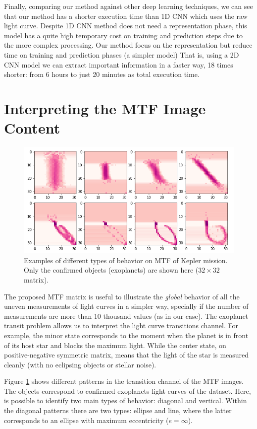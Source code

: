 Finally, comparing our method against other deep learning techniques, we can see that our method has a shorter execution time than 1D CNN which uses the raw light curve. Despite 1D CNN method does not need a representation phase, this model has a quite high temporary cost on training and prediction steps due to the more complex processing. Our method focus on the representation but reduce time on training and prediction phases (a simpler model)
That is, using a 2D CNN model we can extract important information in a faster way, 18 times shorter: from 6 hours to just 20 minutes as total execution time.

\section{Interpreting the MTF Image Content}
\begin{figure}[t!]
\centering
    \includegraphics[width=.9\linewidth]{imgs/MTF_LC.png}
\caption{Examples of different types of behavior on MTF of Kepler mission. Only the confirmed objects (exoplanets) are shown here ($32\times 32$ matrix).}
\label{ex:mtf}
\end{figure}
The proposed MTF matrix is useful to illustrate the \textit{global} behavior of all the uneven measurements of light curves in a simpler way, specially if the number of measurements are more than 10 thousand values (as in our case).
The exoplanet transit problem allows us to interpret the light curve transitions channel. For example, the minor state corresponds to the moment when the planet is in front of its host star and blocks the maximum light. While the center state, on positive-negative symmetric matrix, means that the light of the star is measured cleanly (with no eclipsing objects or stellar noise).
 
Figure \ref{ex:mtf} shows different patterns in the transition channel of the MTF images. The objects correspond to confirmed exoplanets light curves of the dataset.
Here, is possible to identify two main types of behavior: diagonal and vertical. Within the diagonal patterns there are two types: ellipse and line, where the latter corresponds to an ellipse with maximum eccentricity ($e=\infty$). 

